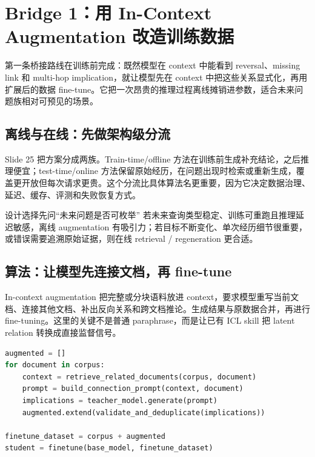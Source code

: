 \section{Bridge 1：用 In-Context Augmentation 改造训练数据}

第一条桥接路线在训练前完成：既然模型在 context 中能看到 reversal、missing link 和 multi-hop implication，就让模型先在 context 中把这些关系显式化，再用扩展后的数据 fine-tune。它把一次昂贵的推理过程离线摊销进参数，适合未来问题族相对可预见的场景。

\subsection{离线与在线：先做架构级分流}

Slide 25 把方案分成两族。Train-time/offline 方法在训练前生成补充结论，之后推理便宜；test-time/online 方法保留原始经历，在问题出现时检索或重新生成，覆盖更开放但每次请求更贵。这个分流比具体算法名更重要，因为它决定数据治理、延迟、缓存、评测和失败恢复方式。


\begin{importantbox}{设计选择先问“未来问题是否可枚举”}
若未来查询类型稳定、训练可重跑且推理延迟敏感，离线 augmentation 有吸引力；若目标不断变化、单次经历细节很重要，或错误需要追溯原始证据，则在线 retrieval / regeneration 更合适。
\end{importantbox}

\subsection{算法：让模型先连接文档，再 fine-tune}

In-context augmentation 把完整或分块语料放进 context，要求模型重写当前文档、连接其他文档、补出反向关系和跨文档推论。生成结果与原数据合并，再进行 fine-tuning。这里的关键不是普通 paraphrase，而是让已有 ICL skill 把 latent relation 转换成直接监督信号。


\begin{lstlisting}[language=Python,caption={In-context augmentation 的最小实现框架}]
augmented = []
for document in corpus:
    context = retrieve_related_documents(corpus, document)
    prompt = build_connection_prompt(context, document)
    implications = teacher_model.generate(prompt)
    augmented.extend(validate_and_deduplicate(implications))

finetune_dataset = corpus + augmented
student = finetune(base_model, finetune_dataset)
\end{lstlisting}

